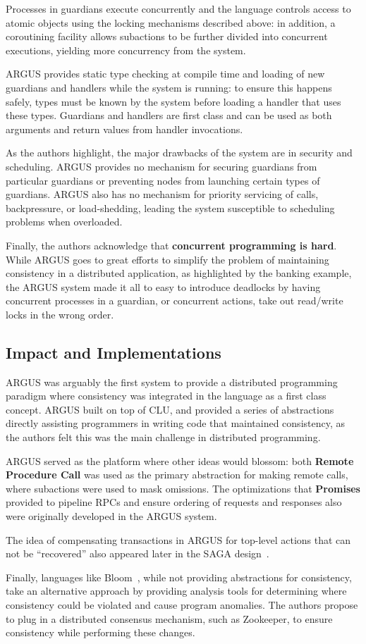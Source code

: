 Processes in guardians execute concurrently and the language controls access to atomic objects using the locking mechanisms described above: in addition, a coroutining facility allows subactions to be further divided into concurrent executions, yielding more concurrency from the system.

ARGUS provides static type checking at compile time and loading of new guardians and handlers while the system is running: to ensure this happens safely, types must be known by the system before loading a handler that uses these types.  Guardians and handlers are first class and can be used as both arguments and return values from handler invocations.

As the authors highlight, the major drawbacks of the system are in security and scheduling.  ARGUS provides no mechanism for securing  guardians from particular guardians or preventing nodes from launching certain types of guardians.  ARGUS also has no mechanism for priority servicing of calls, backpressure, or load-shedding, leading the system susceptible to scheduling problems when overloaded.

Finally, the authors acknowledge that \textbf{concurrent programming is hard}.  While ARGUS goes to great efforts to simplify the problem of maintaining consistency in a distributed application, as highlighted by the banking example, the ARGUS system made it all to easy to introduce deadlocks by having concurrent processes in a guardian, or concurrent actions, take out read/write locks in the wrong order.

\subsection{Impact and Implementations}

ARGUS was arguably the first system to provide a distributed programming paradigm where consistency was integrated in the language as a first class concept.  ARGUS built on top of CLU, and provided a series of abstractions directly assisting programmers in writing code that maintained consistency, as the authors felt this was the main challenge in distributed programming.

ARGUS served as the platform where other ideas would blossom: both \textbf{Remote Procedure Call} was used as the primary abstraction for making remote calls, where subactions were used to mask omissions.  The optimizations that \textbf{Promises} provided to pipeline RPCs and ensure ordering of requests and responses also were originally developed in the ARGUS system.

The idea of compensating transactions in ARGUS for top-level actions that can not be ``recovered'' also appeared later in the SAGA design~\cite{garcia1987sagas}.

Finally, languages like Bloom~\cite{alvaro2011consistency}, while not providing abstractions for consistency, take an alternative approach by providing analysis tools for determining where consistency could be violated and cause program anomalies.  The authors propose to plug in a distributed consensus mechanism, such as Zookeeper, to ensure consistency while performing these changes.